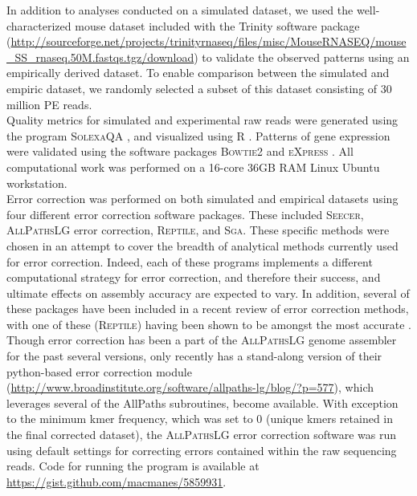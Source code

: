 \documentclass[11pt]{article}
\begin{document}
\noindent
In addition to analyses conducted on a simulated dataset, we used the well-characterized mouse dataset included with the Trinity software package (\url{http://sourceforge.net/projects/trinityrnaseq/files/misc/MouseRNASEQ/mouse_SS_rnaseq.50M.fastqs.tgz/download}) to validate the observed patterns using an empirically derived dataset.  To enable comparison between the simulated and empiric dataset, we randomly selected a subset of this dataset consisting of 30 million PE reads. \\

\noindent
Quality metrics for simulated and experimental raw reads were generated using the program \textsc{SolexaQA} \citep{Cox:2010ch}, and visualized using R \citep{RALanguageandEn:wf}. Patterns of gene expression were validated using the software packages \textsc{Bowtie2} \citep{Trapnell:2010kd} and \textsc{eXpress} \citep{Roberts:2012dh}. All computational work was performed on a 16-core 36GB RAM Linux Ubuntu workstation. \\

\noindent
Error correction was performed on both simulated and empirical datasets using four different error correction software packages. These included \textsc{Seecer}, \textsc{AllPathsLG} error correction, \textsc{Reptile}, and \textsc{Sga}. These specific methods were chosen in an attempt to cover the breadth of analytical methods currently used for error correction. Indeed, each of these programs implements a different computational strategy for error correction, and therefore their success, and ultimate effects on assembly accuracy are expected to vary.  In addition, several of these packages have been included in a recent review of error correction methods, with one of these (\textsc{Reptile}) having been shown to be amongst the most accurate \citep{Yang:2013ck}.  \\

\noindent
Though error correction has been a part of the \textsc{AllPathsLG} genome assembler for the past several versions, only recently has a stand-along version of their python-based error correction module (\url{http://www.broadinstitute.org/software/allpaths-lg/blog/?p=577}), which leverages several of the AllPaths subroutines, become available.  With exception to the minimum kmer frequency, which was set to 0 (unique kmers retained in the final corrected dataset), the \textsc{AllPathsLG} error correction software was run using default settings for correcting errors contained within the raw sequencing reads.  Code for running the program is available at \url{https://gist.github.com/macmanes/5859931}.   \\
\end{document}
